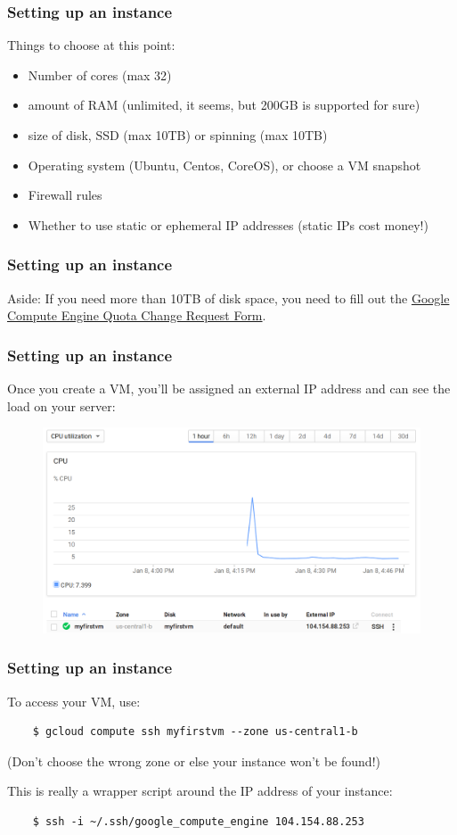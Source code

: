 \documentclass[9pt]{beamer}
\begin{document}
\begin{frame}[fragile]
  \frametitle{Setting up an instance}
  Things to choose at this point:
  \pause
  \begin{itemize}
  \item Number of cores (max 32)
    \pause
  \item amount of RAM (unlimited, it seems, but 200GB is supported for sure)
    \pause
  \item size of disk, SSD (max 10TB) or spinning (max 10TB) 
    \pause
  \item Operating system (Ubuntu, Centos, CoreOS), or choose a VM snapshot
    \pause
  \item Firewall rules
    \pause
  \item Whether to use static or ephemeral IP addresses (static IPs cost money!)
  \end{itemize}
\end{frame}

\begin{frame}[fragile]
  \frametitle{Setting up an instance}
  Aside: If you need more than 10TB of disk space, you need to fill out the \href{https://docs.google.com/a/google.com/forms/d/1vb2MkAr9JcHrp6myQ3oTxCyBv2c7Iyc5wqIKqE3K4IE/viewform}{Google Compute Engine Quota Change Request Form}.
\end{frame}

\begin{frame}[fragile]
  \frametitle{Setting up an instance}
  Once you create a VM, you'll be assigned an external IP address and can see the load on your server:
  \begin{figure}
    \includegraphics[scale=0.2]{figures/VMUp.png}
  \end{figure}
\end{frame}

\begin{frame}[fragile]
  \frametitle{Setting up an instance}
  To access your VM, use:
  \begin{verbatim}
    $ gcloud compute ssh myfirstvm --zone us-central1-b
  \end{verbatim}
  (Don't choose the wrong zone or else your instance won't be found!)

  This is really a wrapper script around the IP address of your instance:
  \begin{verbatim}
    $ ssh -i ~/.ssh/google_compute_engine 104.154.88.253
  \end{verbatim}
\end{frame}
\end{document}
